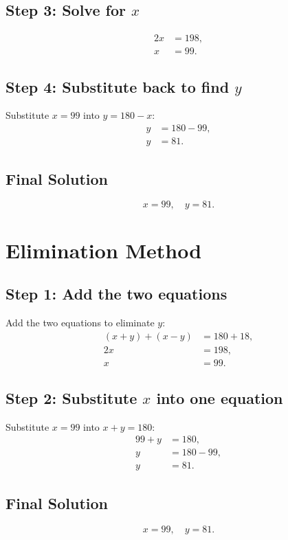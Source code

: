 \documentclass[journal]{IEEEtran}
\begin{document}
\subsection*{Step 3: Solve for \(x\)}
\begin{align}
    2x &= 198, \\
    x &= 99.
\end{align}

\subsection*{Step 4: Substitute back to find \(y\)}
Substitute \(x = 99\) into \(y = 180 - x\):
\begin{align}
    y &= 180 - 99, \\
    y &= 81.
\end{align}

\subsection*{Final Solution}
\[\boxed{x = 99, \quad y = 81.}\]

\section{Elimination Method}
\subsection*{Step 1: Add the two equations}
Add the two equations to eliminate \(y\):
\begin{align}
    (x + y) + (x - y) &= 180 + 18, \\
    2x &= 198, \\
    x &= 99.
\end{align}

\subsection*{Step 2: Substitute \(x\) into one equation}
Substitute \(x = 99\) into \(x + y = 180\):
\begin{align}
    99 + y &= 180, \\
    y &= 180 - 99, \\
    y &= 81.
\end{align}

\subsection*{Final Solution}
\[\boxed{x = 99, \quad y = 81.}\]
\end{document}
